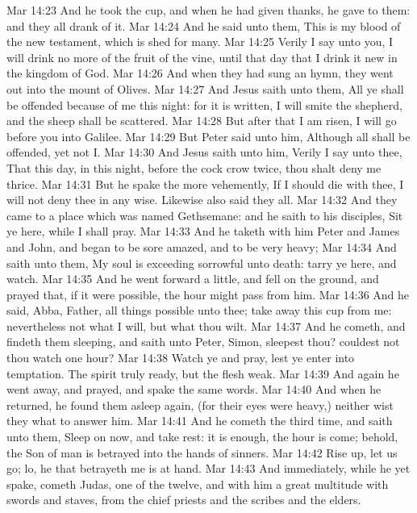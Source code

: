 \vs Mar 14:23 And he took the cup, and when he had given thanks, he gave  to them: and they all drank of it.
\vs Mar 14:24 And he said unto them, This is my blood of the new testament, which is shed for many.
\vs Mar 14:25 Verily I say unto you, I will drink no more of the fruit of the vine, until that day that I drink it new in the kingdom of God.
\vs Mar 14:26 And when they had sung an hymn, they went out into the mount of Olives.
\vs Mar 14:27 And Jesus saith unto them, All ye shall be offended because of me this night: for it is written, I will smite the shepherd, and the sheep shall be scattered.
\vs Mar 14:28 But after that I am risen, I will go before you into Galilee.
\vs Mar 14:29 But Peter said unto him, Although all shall be offended, yet  not I.
\vs Mar 14:30 And Jesus saith unto him, Verily I say unto thee, That this day,  in this night, before the cock crow twice, thou shalt deny me thrice.
\vs Mar 14:31 But he spake the more vehemently, If I should die with thee, I will not deny thee in any wise. Likewise also said they all.
\vs Mar 14:32 And they came to a place which was named Gethsemane: and he saith to his disciples, Sit ye here, while I shall pray.
\vs Mar 14:33 And he taketh with him Peter and James and John, and began to be sore amazed, and to be very heavy;
\vs Mar 14:34 And saith unto them, My soul is exceeding sorrowful unto death: tarry ye here, and watch.
\vs Mar 14:35 And he went forward a little, and fell on the ground, and prayed that, if it were possible, the hour might pass from him.
\vs Mar 14:36 And he said, Abba, Father, all things  possible unto thee; take away this cup from me: nevertheless not what I will, but what thou wilt.
\vs Mar 14:37 And he cometh, and findeth them sleeping, and saith unto Peter, Simon, sleepest thou? couldest not thou watch one hour?
\vs Mar 14:38 Watch ye and pray, lest ye enter into temptation. The spirit truly  ready, but the flesh  weak.
\vs Mar 14:39 And again he went away, and prayed, and spake the same words.
\vs Mar 14:40 And when he returned, he found them asleep again, (for their eyes were heavy,) neither wist they what to answer him.
\vs Mar 14:41 And he cometh the third time, and saith unto them, Sleep on now, and take  rest: it is enough, the hour is come; behold, the Son of man is betrayed into the hands of sinners.
\vs Mar 14:42 Rise up, let us go; lo, he that betrayeth me is at hand.
\vs Mar 14:43 And immediately, while he yet spake, cometh Judas, one of the twelve, and with him a great multitude with swords and staves, from the chief priests and the scribes and the elders.
